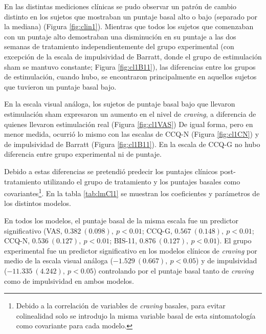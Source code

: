 En las distintas mediciones clínicas se pudo observar un patrón de cambio distinto en los sujetos que mostraban un puntaje basal alto o bajo (separado por la mediana) (Figura \ref{fig:clin1}). Mientras que todos los sujetos que comenzaban con un puntaje alto demostraban una disminución en su puntaje a las dos semanas de tratamiento independientemente del grupo experimental (con excepción de la escala de impulsividad de Barratt, donde el grupo de estimulación sham se mantuvo constante; Figura \ref{fig:cl1B11}), las diferencias entre los grupos de estimulación, cuando hubo, se encontraron principalmente en aquellos sujetos que tuvieron un puntaje basal bajo. \par
En la escala visual análoga, los sujetos de puntaje basal bajo que llevaron estimulación sham expresaron un aumento en el nivel de \textit{craving}, a diferencia de quienes llevaron estimulación real (Figura \ref{fig:cl1VAS}) De igual forma, pero en menor medida, ocurrió lo mismo con las escalas de CCQ-N (Figura \ref{fig:cl1CN}) y de impulsividad de Barratt (Figura \ref{fig:cl1B11}). En la escala de CCQ-G no hubo diferencia entre grupo experimental ni de puntaje. \par

Debido a estas diferencias se pretendió predecir los puntajes clínicos post-tratamiento utilizando el grupo de tratamiento y los puntajes basales como covariantes\footnote{Debido a la correlación de variables de \textit{craving} basales, para evitar colinealidad solo se introdujo la misma variable basal de esta sintomatología como covariante para cada modelo.}. En la tabla \ref{tab:lmCl1} se muestran los coeficientes y parámetros de los distintos modelos. \par
En todos los modelos, el puntaje basal de la misma escala fue un predictor significativo (VAS, $0.382\ (0.098),\ p<0.01$; CCQ-G, $0.567\ (0.148),\ p<0.01$; CCQ-N, $0.536\ (0.127),\ p<0.01$; BIS-11, $0.876\ (0.127),\ p<0.01$). El grupo experimental fue un predictor significativo en los modelos clínicos de \textit{craving} por medio de la escala visual análoga ($-1.529\ (0.667),\ p<0.05$) y de impulsividad ($-11.335\ (4.242),\ p<0.05$) controlando por el puntaje basal tanto de \textit{craving} como de impulsividad en ambos modelos.

